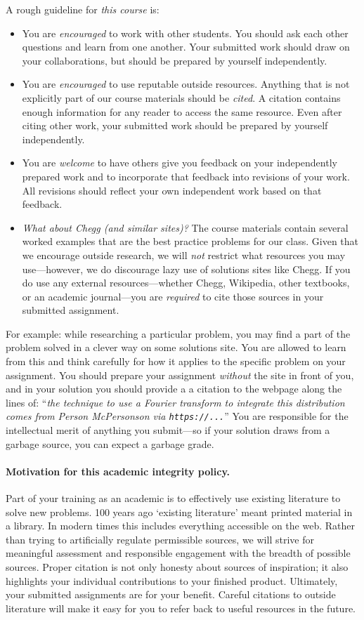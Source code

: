 \documentclass[12pt]{article}
\numberwithin{equation}{section}    %
\begin{document}
A rough guideline for \emph{this course} is:
\begin{itemize}
	\item You are \emph{encouraged} to work with other students. You should ask each other questions and learn from one another. Your submitted work should draw on your collaborations, but should be prepared by yourself independently.
	\item You are \emph{encouraged} to use reputable outside resources. Anything that is not explicitly part of our course materials should be \emph{cited}. A citation contains enough information for any reader to access the same resource. Even after citing other work, your submitted work should be prepared by yourself independently.
	\item You are \emph{welcome} to have others give you feedback on your independently prepared work and to incorporate that feedback into revisions of your work. All revisions should reflect your own independent work based on that feedback.
	\item \emph{What about Chegg (and similar sites)?} The course materials contain several worked examples that are the best practice problems for our class. Given that we encourage outside research, we will \emph{not} restrict what resources you may use---however, we do discourage lazy use of solutions sites like Chegg. If you do use any external resources---whether Chegg, Wikipedia, other textbooks, or an academic journal---you are \emph{required} to cite those sources in your submitted assignment. 
\end{itemize}
For example: while researching a particular problem, you may find a part of the problem solved in a clever way on some solutions site. You are allowed to learn from this and think carefully for how it applies to the specific problem on your assignment. You should prepare your assignment \emph{without} the site in front of you, and in your solution you should provide a a citation to the webpage along the lines of: ``\emph{the technique to use a Fourier transform to integrate this distribution comes from Person McPersonson via \texttt{https://...}}'' You are responsible for the intellectual merit of anything you submit---so if your solution draws from a garbage source, you can expect a garbage grade.

\paragraph{Motivation for this academic integrity policy.} Part of your training as an academic is to effectively use existing literature to solve new problems. 100 years ago `existing literature' meant printed material in a library. In modern times this includes everything accessible on the web. Rather than trying to artificially regulate permissible sources, we will strive for meaningful assessment and responsible engagement with the breadth of possible sources. Proper citation is not only honesty about sources of inspiration; it also highlights your individual contributions to your finished product. 
%
Ultimately, your submitted assignments are for your benefit. Careful citations to outside literature will make it easy for you to refer back to useful resources in the future. 
\end{document}
